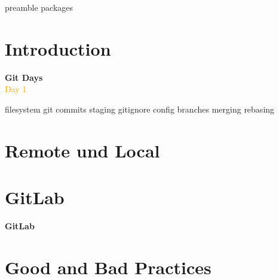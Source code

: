 \RequirePackage{import}
{preamble}
{packages}


    \section{Introduction}\label{sec:introduction}

    \begin{frame}[c]
        \centering
        \Huge
        \textbf{Git Days}
        \\
        \vspace{1ex}
        \Large
        \textcolor{orange}{Day 1}
    \end{frame}

    {filesystem}
    {git}
    {commits}
    {staging}
    {gitignore}
    {config}
    {branches}
    {merging}
    {rebasing}


    \section{Remote und Local}\label{sec:remote-und-local}

    \begin{frame}[c]
        \slidehead
        \center
    \end{frame}


    \section{GitLab}\label{sec:gitlab}

    \begin{frame}[c]
        \centering
        \Large
        \textbf{GitLab}
    \end{frame}


    \section{Good and Bad Practices}\label{sec:good-and-bad-practices}


